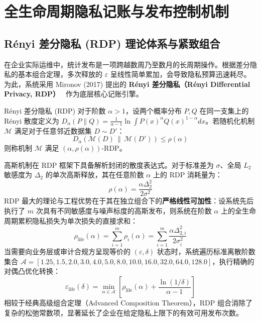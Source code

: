 \section{全生命周期隐私记账与发布控制机制}
\label{sec:accounting_release}

\subsection{Rényi 差分隐私 (RDP) 理论体系与紧致组合}
在企业实际运维中，统计发布是一项跨越数周乃至数月的长周期操作。根据差分隐私的基本组合定理，多次释放的 $\varepsilon$ 呈线性简单累加，会导致隐私预算迅速耗尽。为此，系统采用 Mironov (2017) 提出的 \textbf{Rényi 差分隐私（Rényi Differential Privacy, RDP）}~\cite{mironov2017renyi} 作为底层核心记账引擎。

\begin{definitionbox}{Rényi 差分隐私 (RDP)}
对于阶数 $\alpha > 1$，设两个概率分布 $P, Q$ 在同一支集上的 Rényi 散度定义为 $D_\alpha(P \parallel Q) = \frac{1}{\alpha - 1} \ln \int P(x)^\alpha Q(x)^{1-\alpha} dx$。若随机化机制 $\mathcal{M}$ 满足对于任意邻近数据集 $D \sim D'$：
\begin{equation}
  D_\alpha\left(\mathcal{M}(D) \,\parallel\, \mathcal{M}(D')\right) \le \rho(\alpha)
\end{equation}
则称机制 $\mathcal{M}$ 满足 $(\alpha, \rho(\alpha))$-RDP。
\end{definitionbox}

高斯机制在 RDP 框架下具备解析封闭的散度表达式。对于标准差为 $\sigma$、全局 $L_2$ 敏感度为 $\Delta_2$ 的单次高斯释放，其在任意阶数 $\alpha$ 上的 RDP 消耗量为：
\begin{equation}
  \label{eq:rdp_cost}
  \rho(\alpha) = \frac{\alpha \Delta_2^2}{2 \sigma^2}
\end{equation}
RDP 最大的理论与工程优势在于其在独立组合下的\textbf{严格线性可加性}：设系统先后执行了 $m$ 次具有不同敏感度与噪声标度的高斯发布，则系统在阶数 $\alpha$ 上的全生命周期累积隐私损失为单次损失的直接求和：
\begin{equation}
  \rho_{\text{life}}(\alpha) = \sum_{i=1}^m \rho_i(\alpha) = \sum_{i=1}^m \frac{\alpha \Delta_{2, i}^2}{2 \sigma_i^2}
\end{equation}
当需要向业务层或审计合规方呈现等价的 $(\varepsilon, \delta)$ 状态时，系统遍历标准离散阶数集合 $\mathcal{A} = [1.25, 1.5, 2.0, 3.0, 4.0, 5.0, 8.0, 10.0, 16.0, 32.0, 64.0, 128.0]$，执行精确的对偶凸优化转换：
\begin{equation}
  \label{eq:rdp_conversion}
  \varepsilon_{\text{life}}(\delta) = \min_{\alpha \in \mathcal{A}} \left[ \rho_{\text{life}}(\alpha) + \frac{\ln(1/\delta)}{\alpha - 1} \right]
\end{equation}
相较于经典高级组合定理（Advanced Composition Theorem），RDP 组合消除了复杂的松弛常数项，显著延长了企业在给定隐私上限下的有效可用发布次数。

